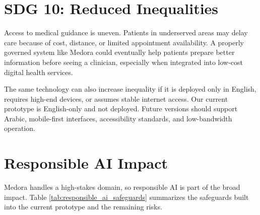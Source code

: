 \section{SDG 10: Reduced Inequalities}

Access to medical guidance is uneven. Patients in underserved areas may delay care because of cost, distance, or limited appointment availability. A properly governed system like Medora could eventually help patients prepare better information before seeing a clinician, especially when integrated into low-cost digital health services.

The same technology can also increase inequality if it is deployed only in English, requires high-end devices, or assumes stable internet access. Our current prototype is English-only and not deployed. Future versions should support Arabic, mobile-first interfaces, accessibility standards, and low-bandwidth operation.

\section{Responsible AI Impact}

Medora handles a high-stakes domain, so responsible AI is part of the broad impact. Table \ref{tab:responsible_ai_safeguards} summarizes the safeguards built into the current prototype and the remaining risks.

